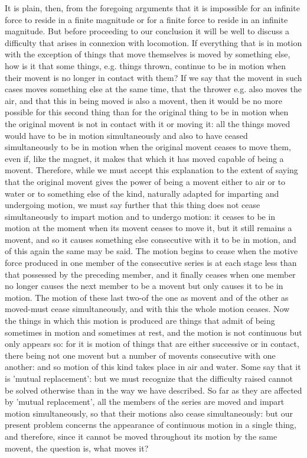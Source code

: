 It is plain, then, from the foregoing arguments that it is impossible
for an infinite force to reside in a finite magnitude or for a finite
force to reside in an infinite magnitude. But before proceeding to
our conclusion it will be well to discuss a difficulty that arises
in connexion with locomotion. If everything that is in motion with
the exception of things that move themselves is moved by something
else, how is it that some things, e.g. things thrown, continue to
be in motion when their movent is no longer in contact with them?
If we say that the movent in such cases moves something else at the
same time, that the thrower e.g. also moves the air, and that this
in being moved is also a movent, then it would be no more possible
for this second thing than for the original thing to be in motion
when the original movent is not in contact with it or moving it: all
the things moved would have to be in motion simultaneously and also
to have ceased simultaneously to be in motion when the original movent
ceases to move them, even if, like the magnet, it makes that which
it has moved capable of being a movent. Therefore, while we must accept
this explanation to the extent of saying that the original movent
gives the power of being a movent either to air or to water or to
something else of the kind, naturally adapted for imparting and undergoing
motion, we must say further that this thing does not cease simultaneously
to impart motion and to undergo motion: it ceases to be in motion
at the moment when its movent ceases to move it, but it still remains
a movent, and so it causes something else consecutive with it to be
in motion, and of this again the same may be said. The motion begins
to cease when the motive force produced in one member of the consecutive
series is at each stage less than that possessed by the preceding
member, and it finally ceases when one member no longer causes the
next member to be a movent but only causes it to be in motion. The
motion of these last two-of the one as movent and of the other as
moved-must cease simultaneously, and with this the whole motion ceases.
Now the things in which this motion is produced are things that admit
of being sometimes in motion and sometimes at rest, and the motion
is not continuous but only appears so: for it is motion of things
that are either successive or in contact, there being not one movent
but a number of movents consecutive with one another: and so motion
of this kind takes place in air and water. Some say that it is 'mutual
replacement': but we must recognize that the difficulty raised cannot
be solved otherwise than in the way we have described. So far as they
are affected by 'mutual replacement', all the members of the series
are moved and impart motion simultaneously, so that their motions
also cease simultaneously: but our present problem concerns the appearance
of continuous motion in a single thing, and therefore, since it cannot
be moved throughout its motion by the same movent, the question is,
what moves it? 


